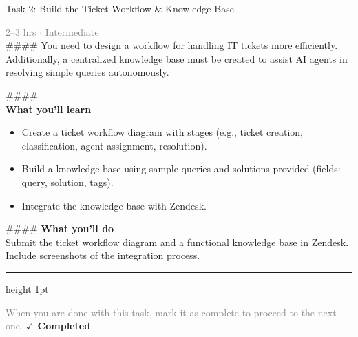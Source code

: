 \documentclass[10pt,a4paper]{article}
\begin{document}
\begin{taskbox}{Task 2: Build the Ticket Workflow \& Knowledge Base}

    {\small \textcolor{gray}{2--3 hrs $\cdot$ Intermediate}}\\[12pt]

    \#\#\#\#   
You need to design a workflow for handling IT tickets more efficiently. Additionally, a centralized knowledge base must be created to assist AI agents in resolving simple queries autonomously.  

\#\#\#\# \\[10pt]
\vspace{8pt}
{\large \textbf{\textcolor{brandLight}{What you'll learn}}}\\[4pt]  
\begin{itemize}
    \item Create a ticket workflow diagram with stages (e.g., ticket creation, classification, agent assignment, resolution).  
    \item Build a knowledge base using sample queries and solutions provided (fields: query, solution, tags).  
    \item Integrate the knowledge base with Zendesk.  
\end{itemize}

\#\#\#\# \vspace{8pt}
{\large \textbf{\textcolor{brandLight}{What you'll do}}}\\[4pt]  
Submit the ticket workflow diagram and a functional knowledge base in Zendesk. Include screenshots of the integration process.\par

    \vspace{16pt}

    \textcolor{cardBorder}{\hrule height 1pt}\vspace{8pt}

    \small \textcolor{gray}{When you are done with this task, mark it as complete to proceed to the next one.} \hfill \textbf{\textcolor{brandDark}{$\checkmark$ Completed}}

\end{taskbox}
\end{document}
